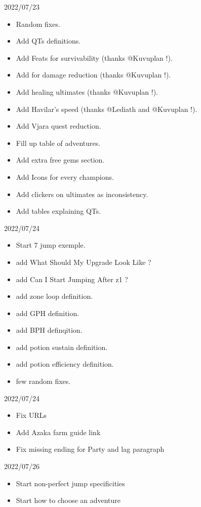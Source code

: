 \documentclass{article}
\begin{document}
2022/07/23
\begin{itemize}
    \item Random fixes.
    \item Add QTs definitions.
    \item Add Feats for survivability (thanks @Kuvuplan !).
    \item Add \selise for damage reduction (thanks @Kuvuplan !).
    \item Add healing ultimates (thanks @Kuvuplan !).
    \item Add Havilar's speed (thanks @Lediath and @Kuvuplan !).
    \item Add Vjara quest reduction.
    \item Fill up table of adventures.
    \item Add extra free gems section.
    \item Add Icons for every champions.
    \item Add clickers on ultimates as inconsistency.
    \item Add tables explaining QTs.
\end{itemize}


2022/07/24
\begin{itemize}
    \item Start 7 jump exemple.
    \item add What Should My Upgrade Look Like ?
    \item add Can I Start Jumping After z1 ?
    \item add zone loop definition.
    \item add GPH definition.
    \item add BPH definqition.
    \item add potion sustain definition.
    \item add potion efficiency definition.
    \item few random fixes.
\end{itemize}

2022/07/24
\begin{itemize}
    \item Fix URLs
    \item Add Azaka farm guide link
    \item Fix missing ending for Party and lag paragraph
\end{itemize}
    
2022/07/26
\begin{itemize}
    \item Start non-perfect jump specificities
    \item Start how to choose an adventure
\end{itemize}
    
\end{document}
